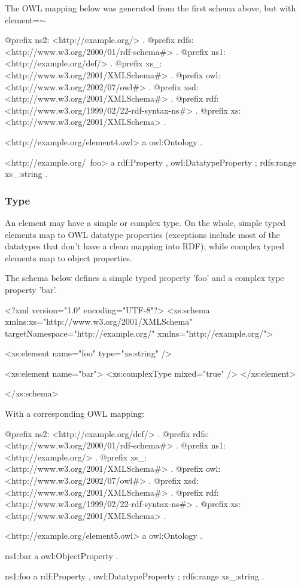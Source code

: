 The OWL mapping below was generated from the first schema above, but with element=$\sim$


\begin{DoxyCodeInclude}
@prefix ns2:     <http://example.org/> .
@prefix rdfs:    <http://www.w3.org/2000/01/rdf-schema#> .
@prefix ns1:     <http://example.org/def/> .
@prefix xs_:     <http://www.w3.org/2001/XMLSchema#> .
@prefix owl:     <http://www.w3.org/2002/07/owl#> .
@prefix xsd:     <http://www.w3.org/2001/XMLSchema#> .
@prefix rdf:     <http://www.w3.org/1999/02/22-rdf-syntax-ns#> .
@prefix xs:      <http://www.w3.org/2001/XMLSchema> .

<http://example.org/element4.owl>
      a       owl:Ontology .

<http://example.org/~foo>
      a       rdf:Property , owl:DatatypeProperty ;
      rdfs:range xs_:string .
\end{DoxyCodeInclude}
\hypertarget{element_Type}{}\subsubsection{Type}\label{element_Type}
An element may have a simple or complex type. On the whole, simple typed elements map to OWL datatype properties (exceptions include most of the datatypes that don't have a clean mapping into RDF); while complex typed elements map to object properties.

The schema below defines a simple typed property 'foo' and a complex type property 'bar'.


\begin{DoxyCodeInclude}
<?xml version="1.0" encoding="UTF-8"?>
<xs:schema xmlns:xs="http://www.w3.org/2001/XMLSchema" 
        targetNamespace="http://example.org/" xmlns="http://example.org/">
        
        <xs:element name="foo" type="xs:string" />
        
        <xs:element name="bar">
                <xs:complexType mixed="true" />
        </xs:element>

</xs:schema>
\end{DoxyCodeInclude}


With a corresponding OWL mapping:


\begin{DoxyCodeInclude}
@prefix ns2:     <http://example.org/def/> .
@prefix rdfs:    <http://www.w3.org/2000/01/rdf-schema#> .
@prefix ns1:     <http://example.org/> .
@prefix xs_:     <http://www.w3.org/2001/XMLSchema#> .
@prefix owl:     <http://www.w3.org/2002/07/owl#> .
@prefix xsd:     <http://www.w3.org/2001/XMLSchema#> .
@prefix rdf:     <http://www.w3.org/1999/02/22-rdf-syntax-ns#> .
@prefix xs:      <http://www.w3.org/2001/XMLSchema> .

<http://example.org/element5.owl>
      a       owl:Ontology .

ns1:bar
      a       owl:ObjectProperty .

ns1:foo
      a       rdf:Property , owl:DatatypeProperty ;
      rdfs:range xs_:string .
\end{DoxyCodeInclude}


